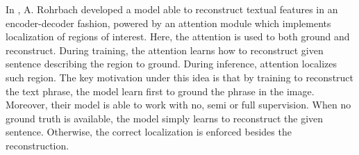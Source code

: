 In \cite{rohrbach2016grounding}, A. Rohrbach \etal{} developed a model
able to reconstruct textual features in an encoder-decoder fashion,
powered by an attention module which implements localization of
regions of interest. Here, the attention is used to both ground and
reconstruct. During training, the attention learns how to reconstruct
given sentence describing the region to ground. During inference,
attention localizes such region. The key motivation under this idea is
that by training to reconstruct the text phrase, the model learn first
to ground the phrase in the image. Moreover, their model is able to
work with no, semi or full supervision. When no ground truth is
available, the model simply learns to reconstruct the given sentence.
Otherwise, the correct localization is enforced besides the
reconstruction.

